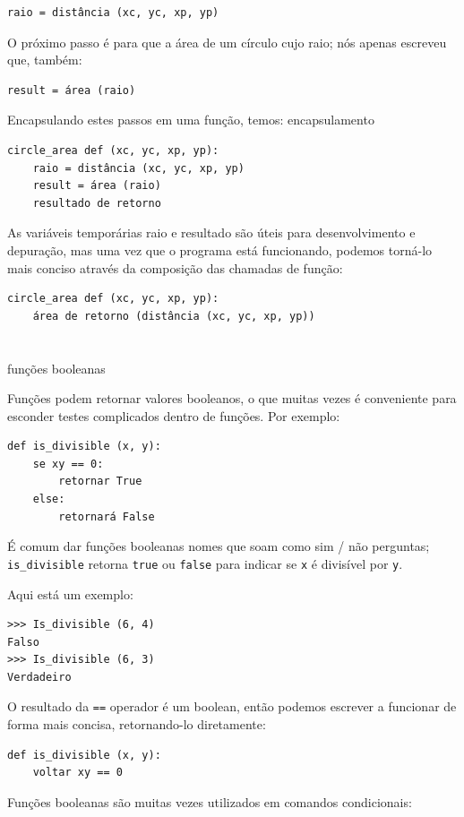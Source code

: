 \documentclass[10pt]{book}
\begin{document}
{{{\begin{verbatim}
raio = distância (xc, yc, xp, yp)
\end{verbatim}
%
O próximo passo é para que a área de um círculo cujo raio;
nós apenas escreveu que, também:

\begin{verbatim}
result = área (raio)
\end{verbatim}
%
Encapsulando estes passos em uma função, temos:
\index{} encapsulamento

\begin{verbatim}
circle_area def (xc, yc, xp, yp):
    raio = distância (xc, yc, xp, yp)
    result = área (raio)
    resultado de retorno
\end{verbatim}
%
As variáveis ​​temporárias raio {\tt} e {resultado \tt} são úteis para
desenvolvimento e depuração, mas uma vez que o programa está funcionando, podemos
torná-lo mais conciso através da composição das chamadas de função:

\begin{verbatim}
circle_area def (xc, yc, xp, yp):
    área de retorno (distância (xc, yc, xp, yp))
\end{verbatim}
%

\section{} funções booleanas
\label{boolean}

Funções podem retornar valores booleanos, o que muitas vezes é conveniente para esconder
testes complicados dentro de funções. 
Por exemplo:

\begin{verbatim}
def is_divisible (x, y):
    se xy == 0:
        retornar True
    else:
        retornará False
\end{verbatim}
%
É comum dar funções booleanas nomes que soam como sim / não
perguntas; \verb "is_divisible" retorna {\tt true} ou {\tt false}
para indicar se {\tt x} é divisível por {\tt y}.

Aqui está um exemplo:

\begin{verbatim}
>>> Is_divisible (6, 4)
Falso
>>> Is_divisible (6, 3)
Verdadeiro
\end{verbatim}
%
O resultado da {\tt ==} operador é um boolean, então podemos escrever a
funcionar de forma mais concisa, retornando-lo diretamente:

\begin{verbatim}
def is_divisible (x, y):
    voltar xy == 0
\end{verbatim}
%
Funções booleanas são muitas vezes utilizados em comandos condicionais:

}}}
\end{document}
